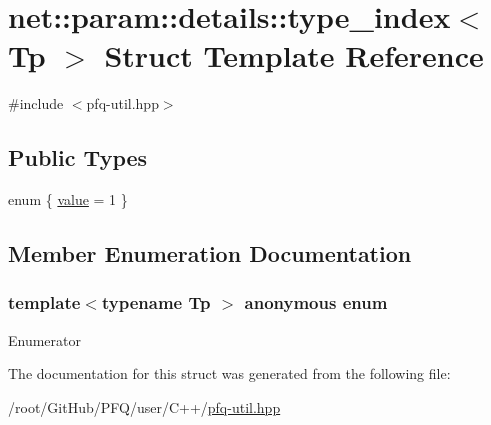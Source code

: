 \hypertarget{structnet_1_1param_1_1details_1_1type__index_3_01Tp_01_4}{\section{net\-:\-:param\-:\-:details\-:\-:type\-\_\-index$<$ Tp $>$ Struct Template Reference}
\label{structnet_1_1param_1_1details_1_1type__index_3_01Tp_01_4}
}


{\ttfamily \#include $<$pfq-\/util.\-hpp$>$}

\subsection*{Public Types}
\begin{DoxyCompactItemize}
\item 
enum \{ \hyperlink{structnet_1_1param_1_1details_1_1type__index_3_01Tp_01_4_aff936ccbc5e8aac0a2398fabfb58cb55a46105c210f804e7866c782cdd2f1c8c9}{value} = 1
 \}
\end{DoxyCompactItemize}


\subsection{Member Enumeration Documentation}
\hypertarget{structnet_1_1param_1_1details_1_1type__index_3_01Tp_01_4_aff936ccbc5e8aac0a2398fabfb58cb55}{\subsubsection[{anonymous enum}]{\setlength{\rightskip}{0pt plus 5cm}template$<$typename Tp $>$ anonymous enum}}\label{structnet_1_1param_1_1details_1_1type__index_3_01Tp_01_4_aff936ccbc5e8aac0a2398fabfb58cb55}
\begin{Desc}
\item[Enumerator]\par
\begin{description}
\item[{\em 
\hypertarget{structnet_1_1param_1_1details_1_1type__index_3_01Tp_01_4_aff936ccbc5e8aac0a2398fabfb58cb55a46105c210f804e7866c782cdd2f1c8c9}{value}\label{structnet_1_1param_1_1details_1_1type__index_3_01Tp_01_4_aff936ccbc5e8aac0a2398fabfb58cb55a46105c210f804e7866c782cdd2f1c8c9}
}]\end{description}
\end{Desc}


The documentation for this struct was generated from the following file\-:\begin{DoxyCompactItemize}
\item 
/root/\-Git\-Hub/\-P\-F\-Q/user/\-C++/\hyperlink{pfq-util_8hpp}{pfq-\/util.\-hpp}\end{DoxyCompactItemize}
